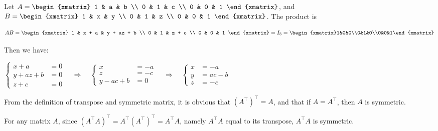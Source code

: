 \begin{exercise}{15}
  Let $A = \begin{xmatrix}
             1 & a & b \\
             0 & 1 & c \\
             0 & 0 & 1
           \end{xmatrix}$,
  and $B = \begin{xmatrix}
             1 & x & y \\
             0 & 1 & z \\
             0 & 0 & 1
           \end{xmatrix}$.
  The product is
  
  $$AB =
    \begin{xmatrix}
      1 & x + a & y + az + b \\
      0 &     1 &      z + c \\
      0 &     0 &          1
    \end{xmatrix} =
    I_3 = \begin{xmatrix}1&0&0\\0&1&0\\0&0&1\end{xmatrix}$$
  
  Then we have:
  \medskip
  
  $\left\{
    \begin{aligned}
           x + a &= 0 \\
      y + az + b &= 0 \\
           z + c &= 0
    \end{aligned}
  \right.\quad \Longrightarrow \quad
  \left\{
    \begin{aligned}
               x &= -a \\
               z &= -c \\
      y - ac + b &= 0
    \end{aligned}
  \right.\quad \Longrightarrow \quad
  \left\{
    \begin{aligned}
      x &= -a     \\
      y &= ac - b \\
      z &= -c
    \end{aligned}
  \right.$
\end{exercise}

\begin{exercise}{16}
  From the definition of transpose and symmetric matrix,
  it is obvious that $(A^{\top})^{\top} = A$,
  and that if $A = A^{\top}$, then $A$ is symmetric.

  For any matrix $A$, since $(A^{\top}A)^{\top} = A^{\top}(A^{\top})^{\top} = A^{\top}A$,
  namely $A^{\top}A$ equal to its transpose, $A^{\top}A$ is symmetric. \QED
\end{exercise}
